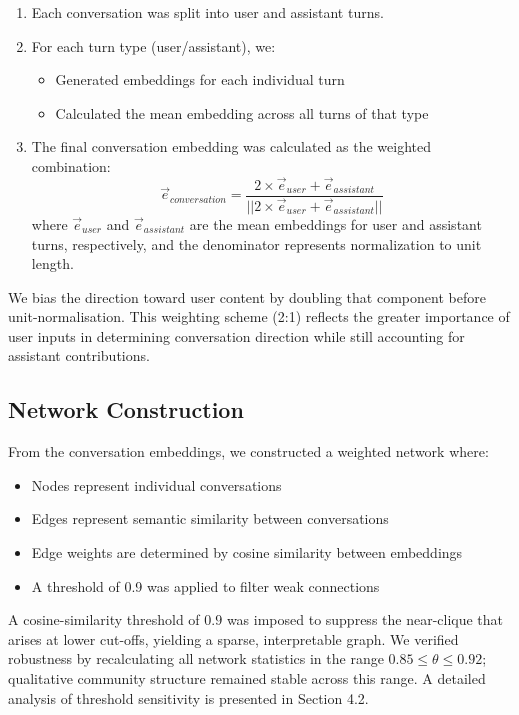 \documentclass[10pt, a4paper]{article}
\begin{document}
\begin{enumerate}
    \item Each conversation was split into user and assistant turns.
    \item For each turn type (user/assistant), we:
    \begin{itemize}
        \item Generated embeddings for each individual turn
        \item Calculated the mean embedding across all turns of that type
    \end{itemize}
    \item The final conversation embedding was calculated as the weighted combination:
    \begin{equation}
    \vec{e}_{conversation} = \frac{2 \times \vec{e}_{user} + \vec{e}_{assistant}}{|\!|2 \times \vec{e}_{user} + \vec{e}_{assistant}|\!|}
    \end{equation}
    where $\vec{e}_{user}$ and $\vec{e}_{assistant}$ are the mean embeddings for user and assistant turns, respectively, and the denominator represents normalization to unit length.
\end{enumerate}

We bias the direction toward user content by doubling that component before unit-normalisation. This weighting scheme (2:1) reflects the greater importance of user inputs in determining conversation direction while still accounting for assistant contributions.

\subsection{Network Construction}

From the conversation embeddings, we constructed a weighted network where:
\begin{itemize}
    \item Nodes represent individual conversations
    \item Edges represent semantic similarity between conversations
    \item Edge weights are determined by cosine similarity between embeddings
    \item A threshold of 0.9 was applied to filter weak connections
\end{itemize}

A cosine-similarity threshold of $0.9$ was imposed to suppress the near-clique that arises at lower cut-offs, yielding a sparse, interpretable graph. We verified robustness by recalculating all network statistics in the range $0.85\le\theta\le0.92$; qualitative community structure remained stable across this range. A detailed analysis of threshold sensitivity is presented in Section 4.2.
\end{document}
